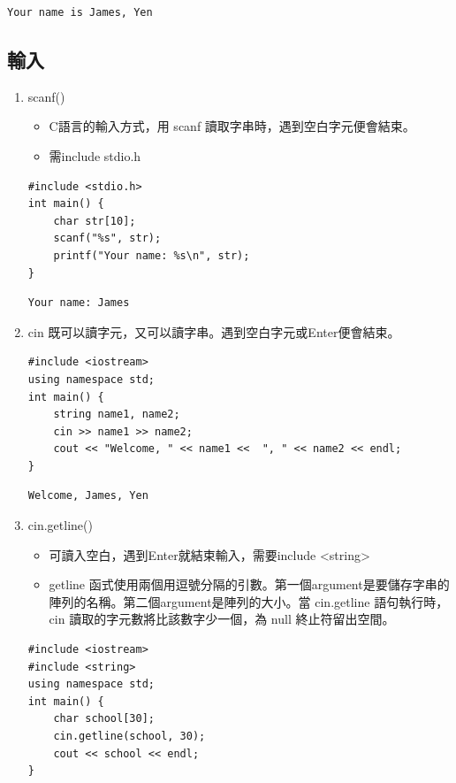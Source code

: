 \documentclass[a4paper,12pt]{article}
\begin{document}
\begin{verbatim}
Your name is James, Yen
\end{verbatim}
\subsection{輸入}
\label{sec:org050fd5e}
\begin{enumerate}
\item scanf()
\label{sec:org6bef0ae}
\begin{itemize}
\item C語言的輸入方式，用 scanf 讀取字串時，遇到空白字元便會結束。\\
\item 需include stdio.h\\
\end{itemize}
\lstset{breaklines=true,language=C,label= ,caption= ,captionpos=b,firstnumber=1,numbers=left}
\begin{lstlisting}
#include <stdio.h>
int main() {
    char str[10];
    scanf("%s", str);
    printf("Your name: %s\n", str);
}
\end{lstlisting}

\begin{verbatim}
Your name: James
\end{verbatim}
\item cin
\label{sec:orge3678c6}
既可以讀字元，又可以讀字串。遇到空白字元或Enter便會結束。\\
\lstset{breaklines=true,language=cpp,label= ,caption= ,captionpos=b,firstnumber=1,numbers=left}
\begin{lstlisting}
#include <iostream>
using namespace std;
int main() {
    string name1, name2;
    cin >> name1 >> name2;
    cout << "Welcome, " << name1 <<  ", " << name2 << endl;
}
\end{lstlisting}

\begin{verbatim}
Welcome, James, Yen
\end{verbatim}
\item cin.getline()
\label{sec:orge22a7b9}
\begin{itemize}
\item 可讀入空白，遇到Enter就結束輸入，需要include <string>\\
\item getline 函式使用兩個用逗號分隔的引數。第一個argument是要儲存字串的陣列的名稱。第二個argument是陣列的大小。當 cin.getline 語句執行時，cin 讀取的字元數將比該數字少一個，為 null 終止符留出空間。\\
\end{itemize}
\lstset{breaklines=true,language=cpp,label= ,caption= ,captionpos=b,firstnumber=1,numbers=left}
\begin{lstlisting}
#include <iostream>
#include <string>
using namespace std;
int main() {
    char school[30];
    cin.getline(school, 30);
    cout << school << endl;
}


\end{lstlisting}
\end{enumerate}
\end{document}
